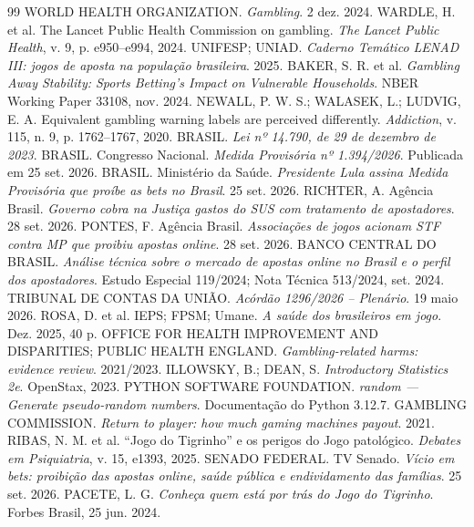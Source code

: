\documentclass[10pt,a4paper]{article}
\begin{document}
\begin{thebibliography}{99}
\footnotesize
{} WORLD HEALTH ORGANIZATION. \textit{Gambling}. 2 dez. 2024.
 WARDLE, H. et al. The Lancet Public Health Commission on gambling. \textit{The Lancet Public Health}, v. 9, p. e950--e994, 2024.
 UNIFESP; UNIAD. \textit{Caderno Temático LENAD III: jogos de aposta na população brasileira}. 2025.
 BAKER, S. R. et al. \textit{Gambling Away Stability: Sports Betting's Impact on Vulnerable Households}. NBER Working Paper 33108, nov. 2024.
 NEWALL, P. W. S.; WALASEK, L.; LUDVIG, E. A. Equivalent gambling warning labels are perceived differently. \textit{Addiction}, v. 115, n. 9, p. 1762--1767, 2020.
 BRASIL. \textit{Lei nº 14.790, de 29 de dezembro de 2023}.
 BRASIL. Congresso Nacional. \textit{Medida Provisória nº 1.394/2026}. Publicada em 25 set. 2026.
 BRASIL. Ministério da Saúde. \textit{Presidente Lula assina Medida Provisória que proíbe as bets no Brasil}. 25 set. 2026.
 RICHTER, A. Agência Brasil. \textit{Governo cobra na Justiça gastos do SUS com tratamento de apostadores}. 28 set. 2026.
 PONTES, F. Agência Brasil. \textit{Associações de jogos acionam STF contra MP que proibiu apostas online}. 28 set. 2026.
 BANCO CENTRAL DO BRASIL. \textit{Análise técnica sobre o mercado de apostas online no Brasil e o perfil dos apostadores}. Estudo Especial 119/2024; Nota Técnica 513/2024, set. 2024.
 TRIBUNAL DE CONTAS DA UNIÃO. \textit{Acórdão 1296/2026 -- Plenário}. 19 maio 2026.
 ROSA, D. et al. IEPS; FPSM; Umane. \textit{A saúde dos brasileiros em jogo}. Dez. 2025, 40 p.
 OFFICE FOR HEALTH IMPROVEMENT AND DISPARITIES; PUBLIC HEALTH ENGLAND. \textit{Gambling-related harms: evidence review}. 2021/2023.
 ILLOWSKY, B.; DEAN, S. \textit{Introductory Statistics 2e}. OpenStax, 2023.
 PYTHON SOFTWARE FOUNDATION. \textit{random --- Generate pseudo-random numbers}. Documentação do Python 3.12.7.
 GAMBLING COMMISSION. \textit{Return to player: how much gaming machines payout}. 2021.
 RIBAS, N. M. et al. ``Jogo do Tigrinho'' e os perigos do Jogo patológico. \textit{Debates em Psiquiatria}, v. 15, e1393, 2025.
 SENADO FEDERAL. TV Senado. \textit{Vício em bets: proibição das apostas online, saúde pública e endividamento das famílias}. 25 set. 2026.
 PACETE, L. G. \textit{Conheça quem está por trás do Jogo do Tigrinho}. Forbes Brasil, 25 jun. 2024.
\end{thebibliography}
\end{document}
